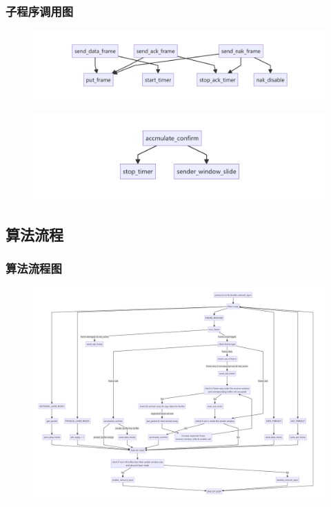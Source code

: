         \subsubsection{子程序调用图}
            \begin{figure}[htbp]
                \centering
                \includegraphics*[width = 16cm]{logic1.png}
            \end{figure}
            \begin{figure}[htbp]
                \centering
                \includegraphics*[width = 16cm]{logic2.png}
            \end{figure}
            
            
    \subsection{算法流程}
        \subsubsection{算法流程图}
            \begin{figure}[htbp]
                \centering
                \includegraphics*[width = 19cm]{logic3.png}
            \end{figure}

